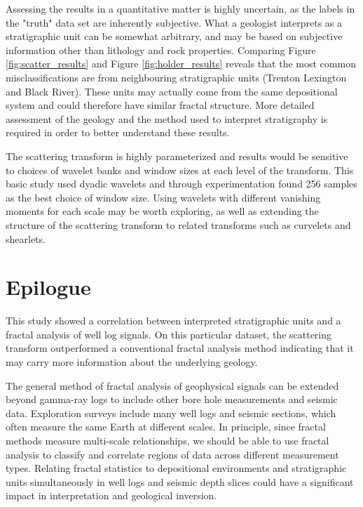 \documentclass[journal]{IEEEtran}
\begin{document}
Assessing the results in a quantitative matter is highly uncertain, as the labels in the "truth" data set are inherently subjective. What a geologist
interprets as a stratigraphic unit can be somewhat arbitrary, and may be based on subjective information other than lithology and rock properties. Comparing 
Figure \ref{fig:scatter_results} and Figure \ref{fig:holder_results} reveals that the most common misclassifications are from neighbouring stratigraphic units (Trenton Lexington and Black River).
These units may actually come from the same depositional system and could therefore have similar fractal structure. More detailed assessment of the geology and 
the method used to interpret stratigraphy is required in order to better understand these results.

The scattering transform is highly parameterized and results would be sensitive to choices of wavelet banks and window sizes at each level of the transform. This basic study
used dyadic wavelets and through experimentation found 256 samples as the best choice of window size. Using wavelets with different vanishing moments for each scale 
may be worth exploring, as well as extending the structure of the scattering transform to related transforms such as curvelets and shearlets.

\section{Epilogue}
This study showed a correlation between interpreted stratigraphic units and a fractal analysis of well log signals. On this particular dataset,
the scattering transform outperformed a conventional fractal analysis method indicating that it may carry more information about the underlying geology.

The general method of fractal analysis of geophysical signals can be extended beyond gamma-ray logs to include other bore hole measurements and seismic data.
Exploration surveys include many well logs and seismic sections, which often measure the same Earth at different scales. In principle, since fractal methods measure multi-scale relationships,
we should be able to use fractal analysis to classify and correlate regions of data across different measurement types. Relating fractal statistics to depositional environments
and stratigraphic units simultaneously in well logs and seismic depth slices could have a significant impact in interpretation and geological inversion.
 
\end{document}

